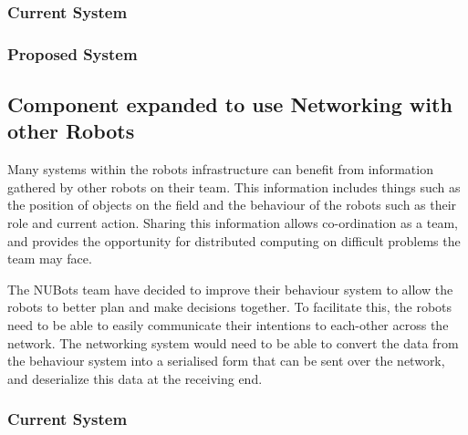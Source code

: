 \documentclass[english,12pt]{scrartcl}
\begin{document}
            \subsubsection{Current System}
            \subsubsection{Proposed System}
                            
        \subsection{Component expanded to use Networking with other Robots}
            Many systems within the robots infrastructure can benefit from information gathered
            by other robots on their team. This information includes things such as the position of
            objects on the field and the behaviour of the robots such as their role and current
            action. Sharing this information allows co-ordination as a team, and provides the
            opportunity for distributed computing on difficult problems the team may face.
            
            The NUBots team have decided to improve their behaviour system to allow the robots to
            better plan and make decisions together. To facilitate this, the robots need to be able
            to easily communicate their intentions to each-other across the network. The networking
            system would need to be able to convert the data from the behaviour system into a
            serialised form that can be sent over the network, and deserialize this data at the
            receiving end.
    
            \subsubsection{Current System}
\end{document}

